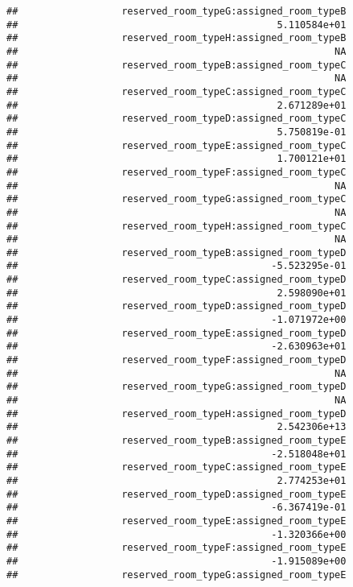 \documentclass[
]{article}
\begin{document}
\begin{verbatim}
##                  reserved_room_typeG:assigned_room_typeB 
##                                             5.110584e+01 
##                  reserved_room_typeH:assigned_room_typeB 
##                                                       NA 
##                  reserved_room_typeB:assigned_room_typeC 
##                                                       NA 
##                  reserved_room_typeC:assigned_room_typeC 
##                                             2.671289e+01 
##                  reserved_room_typeD:assigned_room_typeC 
##                                             5.750819e-01 
##                  reserved_room_typeE:assigned_room_typeC 
##                                             1.700121e+01 
##                  reserved_room_typeF:assigned_room_typeC 
##                                                       NA 
##                  reserved_room_typeG:assigned_room_typeC 
##                                                       NA 
##                  reserved_room_typeH:assigned_room_typeC 
##                                                       NA 
##                  reserved_room_typeB:assigned_room_typeD 
##                                            -5.523295e-01 
##                  reserved_room_typeC:assigned_room_typeD 
##                                             2.598090e+01 
##                  reserved_room_typeD:assigned_room_typeD 
##                                            -1.071972e+00 
##                  reserved_room_typeE:assigned_room_typeD 
##                                            -2.630963e+01 
##                  reserved_room_typeF:assigned_room_typeD 
##                                                       NA 
##                  reserved_room_typeG:assigned_room_typeD 
##                                                       NA 
##                  reserved_room_typeH:assigned_room_typeD 
##                                             2.542306e+13 
##                  reserved_room_typeB:assigned_room_typeE 
##                                            -2.518048e+01 
##                  reserved_room_typeC:assigned_room_typeE 
##                                             2.774253e+01 
##                  reserved_room_typeD:assigned_room_typeE 
##                                            -6.367419e-01 
##                  reserved_room_typeE:assigned_room_typeE 
##                                            -1.320366e+00 
##                  reserved_room_typeF:assigned_room_typeE 
##                                            -1.915089e+00 
##                  reserved_room_typeG:assigned_room_typeE 

\end{verbatim}
\end{document}
